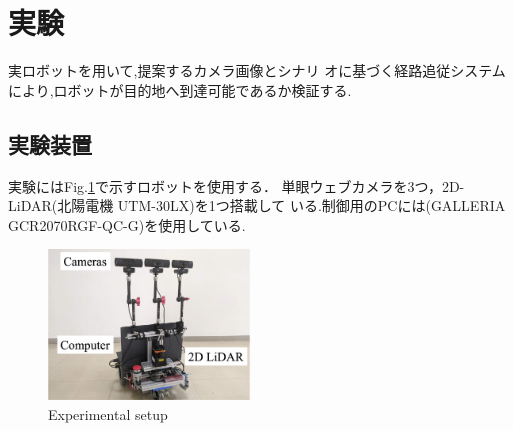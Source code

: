 \documentclass{sice-si}
\begin{document}
\section{実験}
実ロボットを用いて,提案するカメラ画像とシナリ
オに基づく経路追従システムにより,ロボットが目的地へ到達可能であるか検証する.
\subsection{実験装置}
実験にはFig.\ref{fig:gamma}で示すロボットを使用する．
単眼ウェブカメラを3つ，2D-LiDAR(北陽電機 UTM-30LX)を1つ搭載して
いる.制御用のPCには(GALLERIA GCR2070RGF-QC-G)を使用している.
\begin{figure}[t]
    \centering
     \includegraphics[height=40mm]{./figs/gamma_sensor.png}
     \caption{Experimental setup}\label{fig:gamma}
\end{figure}
\end{document}
